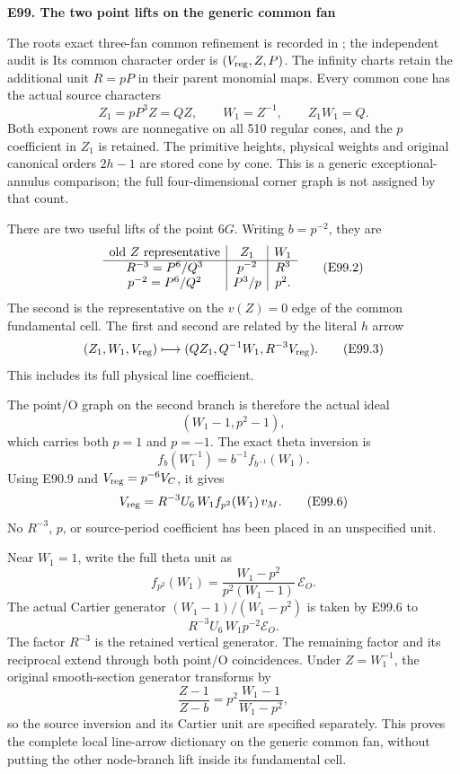 \par

\medskip\noindent\textbf{E99. The two point lifts on the generic common fan}

\par\nobreak

The root\textquotesingle s exact three-fan common refinement is recorded
in ; the
independent audit is
Its common character order is \((V_{\rm reg},Z,P)\).
The infinity charts retain the additional unit
\(R=pP\) in their parent monomial maps. Every
common cone has the actual source characters
\[
 Z_1=pP^3Z=QZ,\qquad W_1=Z^{-1},\qquad
 Z_1W_1=Q.
 \tag{E99.1}
\]
Both exponent rows are nonnegative on all 510 regular
cones, and the \(p\) coefficient in \(Z_1\) is
retained. The primitive heights, physical weights
and original canonical orders \(2h-1\) are stored
cone by cone. This is a generic exceptional-annulus
comparison; the full four-dimensional corner graph
is not assigned by that count.

There are two useful lifts of the point \(6G\).
Writing \(b=p^{-2}\), they are
\[
\begin{array}{c|c|c}
 \hbox{old }Z\hbox{ representative}
     &Z_1&W_1\\ \hline
 R^{-3}=P^6/Q^3 &p^{-2}&R^3\\
 p^{-2}=P^6/Q^2 &P^3/p&p^2 .
\end{array}                                                   \tag{E99.2}
\]
The second is the representative on the \(v(Z)=0\)
edge of the common fundamental cell. The first and
second are related by the literal \(h\) arrow
\[
 (Z_1,W_1,V_{\rm reg})\longmapsto
       (QZ_1,Q^{-1}W_1,R^{-3}V_{\rm reg}).
 \tag{E99.3}
\]
This includes its full physical line coefficient.

The point/O graph on the second branch is therefore
the actual ideal
\[
 (W_1-1,p^2-1),                               \tag{E99.4}
\]
which carries both \(p=1\) and \(p=-1\).
The exact theta inversion is
\[
 f_b(W_1^{-1})=b^{-1}f_{b^{-1}}(W_1).
 \tag{E99.5}
\]
Using E90.9 and \(V_{\rm reg}=p^{-6}V_C\), it gives
\[
 V_{\rm reg}
    =R^{-3}U_6\,W_1 f_{p^2}(W_1)\,v_M.
 \tag{E99.6}
\]
No \(R^{-3}\), \(p\), or source-period coefficient
has been placed in an unspecified unit.

Near \(W_1=1\), write the full theta unit as
\[
 f_{p^2}(W_1)
  =\frac{W_1-p^2}{p^2(W_1-1)}\,\mathcal E_O .
\]
The actual Cartier generator
\((W_1-1)/(W_1-p^2)\) is taken by E99.6 to
\[
 R^{-3}U_6\,W_1p^{-2}\mathcal E_O.              \tag{E99.7}
\]
The factor \(R^{-3}\) is the retained vertical
generator. The remaining factor and its reciprocal
extend through both point/O coincidences. Under
\(Z=W_1^{-1}\), the original smooth-section
generator transforms by
\[
 \frac{Z-1}{Z-b}
   =p^2\frac{W_1-1}{W_1-p^2},                 \tag{E99.8}
\]
so the source inversion and its Cartier unit are
specified separately. This proves the complete
local line-arrow dictionary on the generic common
fan, without putting the other node-branch lift
inside its fundamental cell.

